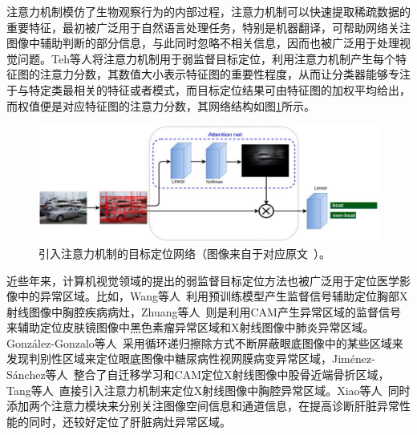 注意力机制模仿了生物观察行为的内部过程，注意力机制可以快速提取稀疏数据的重要特征，最初被广泛用于自然语言处理任务，特别是机器翻译，可帮助网络关注图像中辅助判断的部分信息，与此同时忽略不相关信息，因而也被广泛用于处理视觉问题。Teh等人\cite{BMVC2016_52}将注意力机制用于弱监督目标定位，利用注意力机制产生每个特征图的注意力分数，其数值大小表示特征图的重要性程度，从而让分类器能够专注于与特定类最相关的特征或者模式，而目标定位结果可由特征图的加权平均给出，而权值便是对应特征图的注意力分数，其网络结构如图\ref{fig:attention_weakly_supervised_object_localization}所示。
\begin{figure}[h]
	\centering
	\includegraphics[width=1.0\textwidth]{figure/attention_weakly_supervised_object_localization}
	\caption[引入注意力机制的目标定位网络]{引入注意力机制的目标定位网络（图像来自于对应原文~\cite{BMVC2016_52}）。}
	\label{fig:attention_weakly_supervised_object_localization}
\end{figure}

近些年来，计算机视觉领域的提出的弱监督目标定位方法也被广泛用于定位医学影像中的异常区域。比如，Wang等人~\cite{WangPLLBS17}利用预训练模型产生监督信号辅助定位胸部X射线图像中胸腔疾病病灶，Zhuang等人~\cite{zhuang2019care}则是利用CAM产生异常区域的监督信号来辅助定位皮肤镜图像中黑色素瘤异常区域和X射线图像中肺炎异常区域。Gonz{\'a}lez-Gonzalo等人~\cite{GonzlezGonzalo2018ImprovingWL}采用循环递归擦除方式不断屏蔽眼底图像中的某些区域来发现判别性区域来定位眼底图像中糖尿病性视网膜病变异常区域，Jim{\'e}nez-S{\'a}nchez等人~\cite{JimnezSnchez2018WeaklySupervisedLA}整合了自迁移学习和CAM定位X射线图像中股骨近端骨折区域，Tang等人~\cite{Tang2018AttentionGuidedCL}直接引入注意力机制来定位X射线图像中胸腔异常区域。Xiao等人~\cite{chen2019cascade}同时添加两个注意力模块来分别关注图像空间信息和通道信息，在提高诊断肝脏异常性能的同时，还较好定位了肝脏病灶异常区域。

